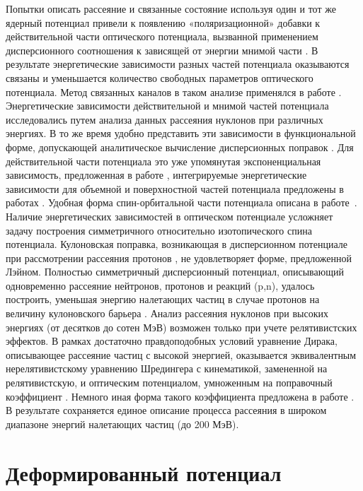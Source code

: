 Попытки описать рассеяние и связанные состояние используя один и тот же ядерный потенциал привели к появлению «поляризационной» добавки к действительной части оптического потенциала, вызванной применением дисперсионного соотношения к зависящей от энергии мнимой части \cite{Lipperheide1966,Passatore1967,Mahaux1984,MahauxBook1991,Morillion2004}. В результате энергетические зависимости разных частей потенциала оказываются связаны и уменьшается количество свободных параметров оптического потенциала. Метод связанных каналов в таком анализе применялся в работе \cite{Romain1997}. Энергетические зависимости действительной и мнимой частей потенциала исследовались путем анализа данных рассеяния нуклонов при различных энергиях. В то же время удобно представить эти зависимости в функциональной форме, допускающей аналитическое вычисление дисперсионных поправок \cite{Quesada2003}. Для действительной части потенциала это уже упомянутая экспоненциальная зависимость, предложенная в работе \cite{Lipperheide1967}, интегрируемые энергетические зависимости для объемной и поверхностной частей потенциала предложены в работах \cite{Brown1961,Delaroche1989}. Удобная форма спин-орбитальной части потенциала описана в работе~\cite{Koning2003}.
Наличие энергетических зависимостей в оптическом потенциале усложняет задачу построения симметричного относительно изотопического спина потенциала. Кулоновская поправка, возникающая в дисперсионном потенциале при рассмотрении рассеяния протонов \cite{Tornow1988}, не удовлетворяет форме, предложенной Лэйном. Полностью симметричный дисперсионный потенциал, описывающий одновременно рассеяние нейтронов, протонов и реакций (p,n), удалось построить, уменьшая энергию налетающих частиц в случае протонов на величину кулоновского барьера \cite{Sun2004}.
Анализ рассеяния нуклонов при высоких энергиях (от десятков до сотен МэВ) возможен только при учете релятивистских эффектов. В рамках достаточно правдоподобных условий уравнение Дирака, описывающее рассеяние частиц с высокой энергией, оказывается эквивалентным нерелятивистскому уравнению Шредингера с кинематикой, замененной на релятивистскую, и оптическим потенциалом, умноженным на поправочный коэффициент \cite{Elton1966}. Немного иная форма такого коэффициента предложена в работе \cite{Madland1997}. В результате сохраняется единое описание процесса рассеяния в широком диапазоне энергий налетающих частиц (до 200 МэВ).

\section{Деформированный потенциал}

